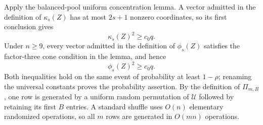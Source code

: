 Apply the balanced-pool uniform concentration lemma.  A vector admitted in the definition of \(\kappa_s(Z)\) has at most \(2s+1\) nonzero coordinates, so its first conclusion gives
\[
 \kappa_s(Z)^2\ge c_0q.
\]
Under \(n\ge9\), every vector admitted in the definition of \(\phi_s(Z)\) satisfies the factor-three cone condition in the lemma, and hence
\[
 \phi_s(Z)^2\ge c_0q.
\]
Both inequalities hold on the same event of probability at least \(1-\rho\); renaming the universal constants proves the probability assertion.  By the definition of \(\Pi_{m,B}\), one row is generated by a uniform random permutation of \(\mathcal U\) followed by retaining its first \(B\) entries.  A standard shuffle uses \(O(n)\) elementary randomized operations, so all \(m\) rows are generated in \(O(mn)\) operations.